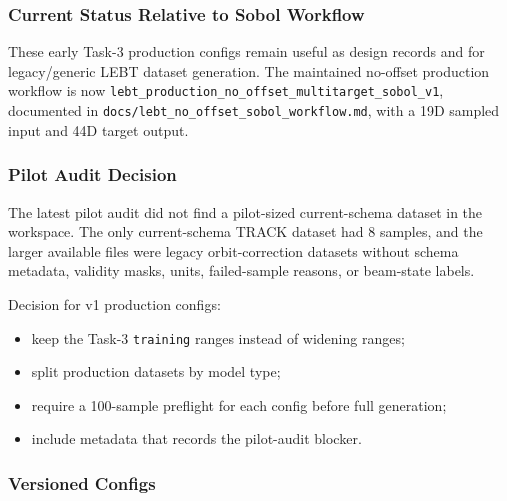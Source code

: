 \documentclass[
]{article}
\providecommand{\tightlist}{%
  \setlength{\itemsep}{0pt}\setlength{\parskip}{0pt}}
\begin{document}
\hypertarget{current-status-relative-to-sobol-workflow}{%
\subsubsection{Current Status Relative to Sobol
Workflow}\label{current-status-relative-to-sobol-workflow}}

These early Task-3 production configs remain useful as design records
and for legacy/generic LEBT dataset generation. The maintained no-offset
production workflow is now
\texttt{lebt\_production\_no\_offset\_multitarget\_sobol\_v1},
documented in \texttt{docs/lebt\_no\_offset\_sobol\_workflow.md}, with a
19D sampled input and 44D target output.

\hypertarget{pilot-audit-decision}{%
\subsubsection{Pilot Audit Decision}\label{pilot-audit-decision}}

The latest pilot audit did not find a pilot-sized current-schema dataset
in the workspace. The only current-schema TRACK dataset had 8 samples,
and the larger available files were legacy orbit-correction datasets
without schema metadata, validity masks, units, failed-sample reasons,
or beam-state labels.

Decision for v1 production configs:

\begin{itemize}
\tightlist
\item
  keep the Task-3 \texttt{training} ranges instead of widening ranges;
\item
  split production datasets by model type;
\item
  require a 100-sample preflight for each config before full generation;
\item
  include metadata that records the pilot-audit blocker.
\end{itemize}

\hypertarget{versioned-configs}{%
\subsubsection{Versioned Configs}\label{versioned-configs}}
\end{document}
